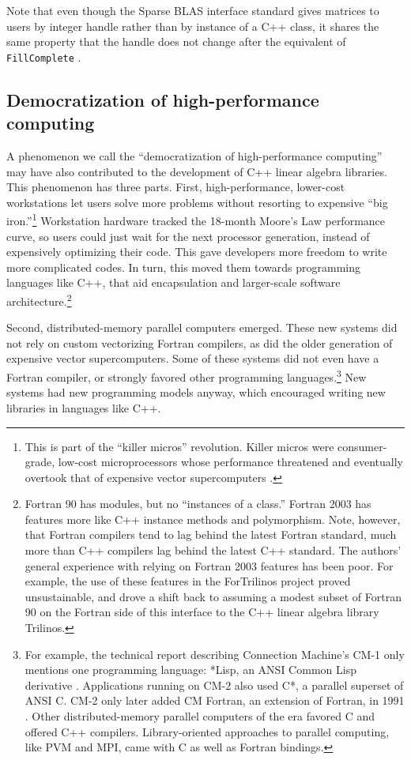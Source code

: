 Note that even though the Sparse BLAS interface standard gives
matrices to users by integer handle rather than by instance of a C++
class, it shares the same property that the handle does not change
after the equivalent of \texttt{FillComplete}
\cite[pp. 129--30]{BLAS-standard}.

\subsection{Democratization of high-performance computing}
\label{SS:90s:demo}

A phenomenon we call the ``democratization of high-performance
computing'' may have also contributed to the development of C++ linear
algebra libraries.  This phenomenon has three parts.  First,
high-performance, lower-cost workstations let users solve more
problems without resorting to expensive ``big iron.''\footnote{This is
  part of the ``killer micros'' revolution.  Killer micros were
  consumer-grade, low-cost microprocessors whose performance
  threatened and eventually overtook that of expensive vector
  supercomputers \cite{killermicros1991}.} Workstation hardware tracked
the 18-month Moore's Law performance curve, so users could just wait
for the next processor generation, instead of expensively optimizing
their code.  This gave developers more freedom to write more
complicated codes.  In turn, this moved them towards programming
languages like C++, that aid encapsulation and larger-scale software
architecture.\footnote{Fortran 90 has modules, but no ``instances of a
  class.''  Fortran 2003 has features more like C++ instance methods
  and polymorphism.  Note, however, that Fortran compilers tend to lag
  behind the latest Fortran standard, much more than C++ compilers lag
  behind the latest C++ standard.  The authors' general experience
  with relying on Fortran 2003 features has been poor.  For example,
  the use of these features in the ForTrilinos project proved
  unsustainable, and drove a shift back to assuming a modest subset of
  Fortran 90 on the Fortran side of this interface to the C++ linear
  algebra library Trilinos.}

Second, distributed-memory parallel computers emerged.  These new
systems did not rely on custom vectorizing Fortran compilers, as did
the older generation of expensive vector supercomputers.  Some of
these systems did not even have a Fortran compiler, or strongly
favored other programming languages.\footnote{For example, the
  technical report describing Connection Machine's CM-1 only mentions
  one programming language: *Lisp, an ANSI Common Lisp derivative
  \cite{kahle1989cm1}.  Applications running on CM-2 also used C*, a
  parallel superset of ANSI C.  CM-2 only later added CM Fortran, an
  extension of Fortran, in 1991 \cite[p. 7]{Kennedy2007}.  Other
  distributed-memory parallel computers of the era favored C and
  offered C++ compilers.  Library-oriented approaches to parallel
  computing, like PVM and MPI, came with C as well as Fortran
  bindings.}  New systems had new programming models anyway, which
encouraged writing new libraries in languages like C++.

